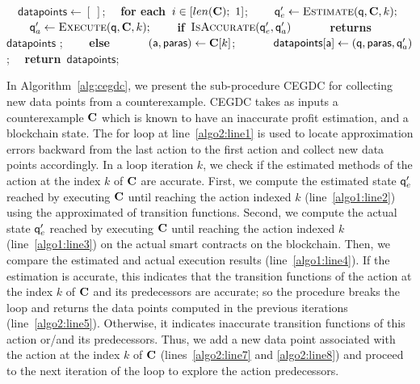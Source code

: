 \setlength{\textfloatsep}{10pt}
\begin{algorithm}[h!]
  \caption{Counterexample guided data collection procedure. It takes a counterexample $\concrete$ and a  state $\q$, and returns datapoints. $i \in [n; 1]$ means that in the first iteration $i = n > 0$. }\label{alg:cegdc}
  \begin{algorithmic}[1]
  \State \ \ $\mathsf{datapoints} \leftarrow [\ ]$;
  \State \ \ \textbf{for each}\ $i \in [len(\mathbf{C});\ 1]$; \label{algo2:line1}
  \State \ \ \ \ $\mathsf{q}'_e \leftarrow \textsc{Estimate}(\mathsf{q}, \mathbf{C}, k);$ \label{algo2:line2}
  \State \ \ \ \ $\mathsf{q}'_a \leftarrow \textsc{Execute}(\mathsf{q}, \mathbf{C}, k);$  \label{algo2:line3}
  \State \ \ \ \ \textbf{if}\ $\textsc{IsAccurate}(\mathsf{q}'_{e}, \mathsf{q}'_{a})$  \label{algo2:line4}
  \State \ \ \ \ \ \ \textbf{returns}\ $\mathsf{datapoints}$ ; \label{algo2:line5}       
  \State \ \ \ \ \textbf{else}
  \State \ \ \ \ \ \ $(\mathsf{a},\textsf{paras}) \leftarrow \mathbf{C}[k]$; \label{algo2:line7}
  \State \ \ \ \ \ \ $\mathsf{datapoints}[\mathsf{a}] \leftarrow (\mathsf{q},\textsf{paras},\mathsf{q}'_{a})$; \label{algo2:line8}
  \State \ \ \textbf{return}\ $\mathsf{datapoints}$;
  \EndProcedure
  \end{algorithmic}
\end{algorithm}

In Algorithm~\ref{alg:cegdc}, we present the sub-procedure \textsc{CEGDC} for collecting new data points from a counterexample. \textsc{CEGDC} takes as inputs a counterexample $\concrete$ which is known to have an inaccurate profit estimation, and a blockchain state. The for loop at line~\ref{algo2:line1} is used to locate approximation errors backward from the last action to the first action and collect new data points accordingly. In a loop iteration $k$, we check if the estimated methods of the action at the index $k$ of $\concrete$ are accurate. First, we compute the estimated state $\mathsf{q}'_e$ reached by executing $\concrete$ until reaching the action indexed $k$ (line~\ref{algo1:line2}) using the approximated of transition functions. 
Second, we compute the actual state $\mathsf{q}'_e$ reached by executing $\concrete$ until reaching the action indexed $k$ (line~\ref{algo1:line3}) on the actual smart contracts on the blockchain. 
Then, we compare the estimated and actual execution results (line~\ref{algo1:line4}). 
If the estimation is accurate, this indicates that the transition functions of the action at the index $k$ of $\concrete$ and its predecessors are accurate; so the procedure breaks the loop and returns the data points computed in the previous iterations (line~\ref{algo2:line5}). Otherwise, it indicates inaccurate transition functions of this action or/and its predecessors. Thus, we add a new data point associated with the action at the index $k$ of $\concrete$ (lines~\ref{algo2:line7} and \ref{algo2:line8}) and proceed to the next iteration of the loop to explore the action predecessors.









